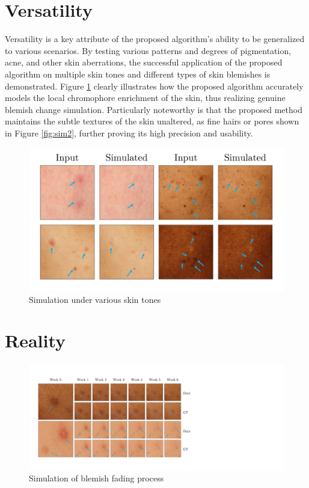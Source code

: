 \begin{spacing}{1.5}
\section{Versatility}
Versatility is a key attribute of the proposed algorithm's ability to be generalized to various scenarios. By testing various patterns and degrees of pigmentation, acne, and other skin aberrations, the successful application of the proposed algorithm on multiple skin tones and different types of skin blemishes is demonstrated. Figure \ref{fig:sim1} clearly illustrates how the proposed algorithm accurately models the local chromophore enrichment of the skin, thus realizing genuine blemish change simulation. Particularly noteworthy is that the proposed method maintains the subtle textures of the skin unaltered, as fine hairs or pores shown in Figure \ref{fig:sim2}, further proving its high precision and usability.
\begin{figure}[t]
    \centering
    \includegraphics[width=\columnwidth]{Chapter5/img_comp4.pdf}
    \caption{Simulation under various skin tones}
    \label{fig:sim1}
\end{figure}

\section{Reality}
\begin{figure}[t!]
    \centering
        \includegraphics[width=\columnwidth]{Chapter5/forward3.pdf}
        \caption{Simulation of blemish fading process}


\end{figure}
\end{spacing}
